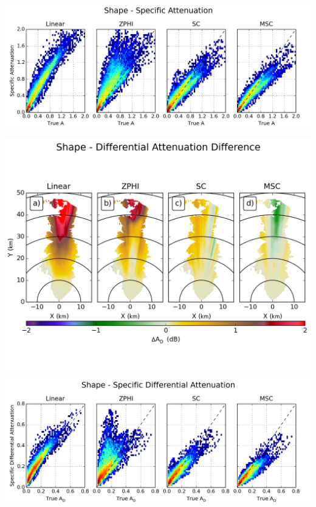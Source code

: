\documentclass[red]{beamer}
\begin{document}
\begin{frame}
	\begin{center}
		\includegraphics[scale=0.45]{figures/C_Shape_Specific_Attenuation_scatter.png}
	\end{center}
\end{frame}

\begin{frame}
	\begin{center}
		\includegraphics[scale=0.45]{figures/C_Shape_Differential_Attenuation_Difference.png}
	\end{center}
\end{frame}

\begin{frame}
	\begin{center}
		\includegraphics[scale=0.45]{figures/C_Shape_Specific_Differential_Attenuation_scatter.png}
	\end{center}
\end{frame}
\end{document}
